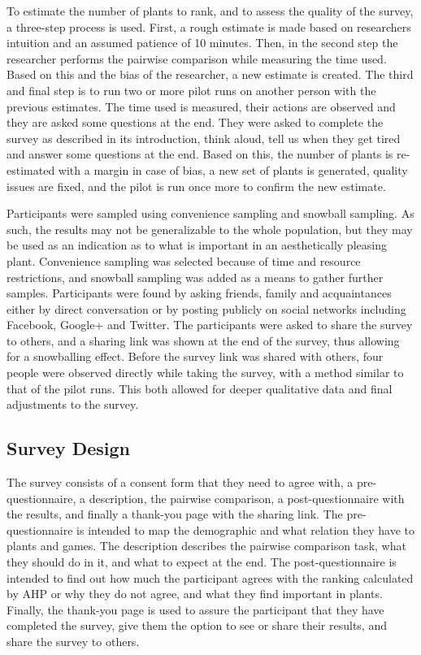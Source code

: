 To estimate the number of plants to rank, and to assess the quality of the survey, a three-step process is used.
First, a rough estimate is made based on researchers intuition and an assumed patience of 10 minutes.
Then, in the second step the researcher performs the pairwise comparison while measuring the time used.
Based on this and the bias of the researcher, a new estimate is created.
The third and final step is to run two or more pilot runs on another person with the previous estimates.
The time used is measured, their actions are observed and they are asked some questions at the end.
They were asked to complete the survey as described in its introduction, think aloud, tell us when they get tired and answer some questions at the end.
Based on this, the number of plants is re-estimated with a margin in case of bias, a new set of plants is generated, quality issues are fixed, and the pilot is run once more to confirm the new estimate.

Participants were sampled using convenience sampling and snowball sampling.
As such, the results may not be generalizable to the whole population, but they may be used as an indication as to what is important in an aesthetically pleasing plant.
Convenience sampling was selected because of time and resource restrictions, and snowball sampling was added as a means to gather further samples.
Participants were found by asking friends, family and acquaintances either by direct conversation or by posting publicly on social networks including Facebook, Google+ and Twitter.
The participants were asked to share the survey to others, and a sharing link was shown at the end of the survey, thus allowing for a snowballing effect.
Before the survey link was shared with others, four people were observed directly while taking the survey, with a method similar to that of the pilot runs.
This both allowed for deeper qualitative data and final adjustments to the survey.

\subsection{Survey Design}
\label{sec:survey-design}
The survey consists of a consent form that they need to agree with, a pre-questionnaire, a description, the pairwise comparison, a post-questionnaire with the results, and finally a thank-you page with the sharing link.
The pre-questionnaire is intended to map the demographic and what relation they have to plants and games.
The description describes the pairwise comparison task, what they should do in it, and what to expect at the end.
The post-questionnaire is intended to find out how much the participant agrees with the ranking calculated by \gls{AHP} or why they do not agree, and what they find important in plants.
Finally, the thank-you page is used to assure the participant that they have completed the survey, give them the option to see or share their results, and share the survey to others.

